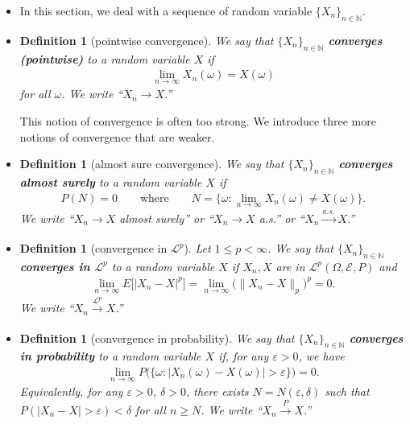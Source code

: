 \documentclass[10pt]{article}
\newtheorem{definition}[lemma]{Definition}
\numberwithin{lemma}{section}
\newcommand{\mcal}[1]{\mathcal{#1}}
\newcommand{\Nat}{\mathbb{N}}
\begin{document}
\begin{itemize}
  \item In this section, we deal with a sequence of random variable $\{ X_n \}_{n \in \Nat}$.

  \item \begin{definition}[pointwise convergence]
    We say that $\{ X_n \}_{n \in \Nat}$ {\bf converges (pointwise)} to a random variable $X$ if
    \begin{align*}
      \lim_{n \rightarrow \infty} X_n(\omega) = X(\omega)
    \end{align*}
    for all $\omega$. We write ``$X_n \rightarrow X$.''
  \end{definition}
  This notion of convergence is often too strong. We introduce three more notions of convergence that are weaker.
  
  \item \begin{definition}[almost sure convergence]
    We say that $\{ X_n \}_{n \in \Nat}$ {\bf converges almost surely} to a random variable $X$ if
    \begin{align*}
    P(N) = 0 \qquad \mbox{where} \qquad N = \bigg\{ \omega: \lim_{n \rightarrow \infty} X_n(\omega) \neq X(\omega) \bigg\}.
    \end{align*}
    We write ``$X_n \rightarrow X$ almost surely'' or ``$X_n \rightarrow X$ a.s\@.'' or ``$X_n \xrightarrow[]{a.s.} X$.''
  \end{definition}

  \item \begin{definition}[convergence in $\mcal{L}^p$]
    Let $1 \leq p < \infty$. We say that $\{ X_n \}_{n \in \Nat}$ {\bf converges in $\mcal{L}^p$} to a random variable $X$ if $X_n, X$ are in $\mcal{L}^p(\Omega, \mcal{E},P)$ and
    \begin{align*}
      \lim_{n \rightarrow \infty} E\big[|X_n - X|^p\big] 
      = \lim_{n \rightarrow \infty} \big(\| X_n - X \|_p\big)^p 
      = 0.
    \end{align*}
    We write ``$X_n \xrightarrow[]{\mcal{L}^p} X$.''
  \end{definition}

  \item \begin{definition}[convergence in probability]
    We say that $\{ X_n \}_{n \in \Nat}$ {\bf converges in probability} to a random variable $X$ if, for any $\varepsilon > 0$, we have
    \begin{align*}
      \lim_{n \rightarrow \infty} P\big( \{ \omega : |X_n(\omega) - X(\omega)| > \varepsilon \} \big) = 0.
    \end{align*}
    Equivalently, for any $\varepsilon > 0$, $\delta > 0$, there exists $N = N(\varepsilon, \delta)$ such that $P(|X_n - X| > \varepsilon) < \delta$ for all $n \geq N$.
    We write ``$X_n \xrightarrow[]{P} X$.''
  \end{definition}


\end{itemize}
\end{document}
